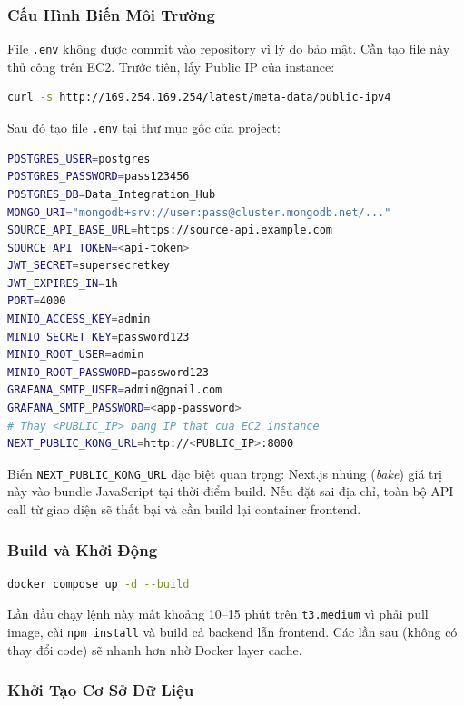 \subsubsection{Cấu Hình Biến Môi Trường}

File \texttt{.env} không được commit vào repository vì lý do bảo mật. Cần
tạo file này thủ công trên EC2. Trước tiên, lấy Public IP của instance:

\begin{lstlisting}[language=bash]
curl -s http://169.254.169.254/latest/meta-data/public-ipv4
\end{lstlisting}

Sau đó tạo file \texttt{.env} tại thư mục gốc của project:

\begin{lstlisting}[language=bash, caption={Nội dung file .env trên EC2}]
POSTGRES_USER=postgres
POSTGRES_PASSWORD=pass123456
POSTGRES_DB=Data_Integration_Hub
MONGO_URI="mongodb+srv://user:pass@cluster.mongodb.net/..."
SOURCE_API_BASE_URL=https://source-api.example.com
SOURCE_API_TOKEN=<api-token>
JWT_SECRET=supersecretkey
JWT_EXPIRES_IN=1h
PORT=4000
MINIO_ACCESS_KEY=admin
MINIO_SECRET_KEY=password123
MINIO_ROOT_USER=admin
MINIO_ROOT_PASSWORD=password123
GRAFANA_SMTP_USER=admin@gmail.com
GRAFANA_SMTP_PASSWORD=<app-password>
# Thay <PUBLIC_IP> bang IP that cua EC2 instance
NEXT_PUBLIC_KONG_URL=http://<PUBLIC_IP>:8000
\end{lstlisting}

Biến \texttt{NEXT\_PUBLIC\_KONG\_URL} đặc biệt quan trọng: Next.js nhúng
(\textit{bake}) giá trị này vào bundle JavaScript tại thời điểm build.
Nếu đặt sai địa chỉ, toàn bộ API call từ giao diện sẽ thất bại và cần
build lại container frontend.

\subsubsection{Build và Khởi Động}

\begin{lstlisting}[language=bash]
docker compose up -d --build
\end{lstlisting}

Lần đầu chạy lệnh này mất khoảng 10--15 phút trên \texttt{t3.medium} vì
phải pull image, cài \texttt{npm install} và build cả backend lẫn frontend.
Các lần sau (không có thay đổi code) sẽ nhanh hơn nhờ Docker layer cache.

\subsubsection{Khởi Tạo Cơ Sở Dữ Liệu}

